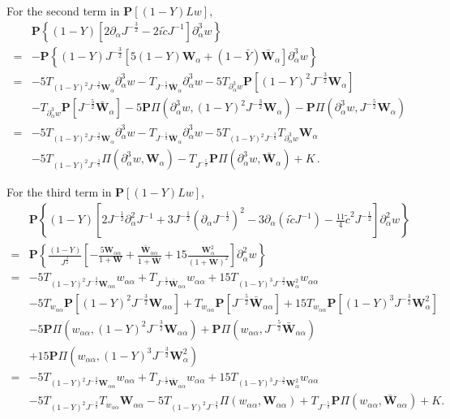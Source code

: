 \documentclass[10pt]{amsart}
\theoremstyle{remark}
\theoremstyle{definition}
\numberwithin{equation}{section}
\newcommand{\p}{\partial}
\newcommand{\al}{\alpha}
\newcommand{\f}{\frac}
\newcommand{\bw}{\mathbf{W}}
\newcommand{\nP}{{\mathbf P}}
\begin{document}
For the second term in $\nP[(1-Y)Lw]$, 
\begin{equation*}
\begin{split}
&\nP\left\{(1-Y)\left[2\p_{\al}J^{-\f32}-2i\tilde{c}J^{-1}\right]\p_{\al}^3w\right\}\\
=&-\nP\left\{(1-Y)J^{-\f32}\left[5(1-Y)\mathbf{W}_{\al}+(1-\bar{Y})\bar{\mathbf{W}}_{\al}\right]\p_{\al}^3w \right\}\\
=&-5T_{(1-Y)^2J^{-\f32}\mathbf{W}_{\al}}\p_{\al}^3w-T_{J^{-\f52}\bar{\bw}_{\al}}\p_{\al}^3w-5T_{\p_{\al}^3w}\nP\left[(1-Y)^2J^{-\f32}\mathbf{W}_{\al}\right] \\
&-T_{\p_{\al}^3w}\nP \left[J^{-\f52}\bar{\bw}_{\al} \right]-5\nP\Pi(\p^3_{\al}w,(1-Y)^2J^{-\f32}\mathbf{W}_{\al})
-\nP\Pi(\p^3_{\al}w,J^{-\f52}\mathbf{W}_{\al})\, \\
=&-5T_{(1-Y)^2J^{-\f32}\mathbf{W}_{\al}}\p_{\al}^3w-T_{J^{-\f52}\bar{\bw}_{\al}}\p_{\al}^3w-5T_{(1-Y)^2J^{-\f32}}T_{\p_{\al}^3w}\mathbf{W}_{\al} \\
&-5T_{(1-Y)^2J^{-\f32}}\Pi(\p^3_{\al}w,\mathbf{W}_{\al})
-T_{J^{-\f52}}\nP\Pi(\p^3_{\al}w,\bar{\bw}_{\al}) + K\, .
\end{split}
\end{equation*}

For the third term  in $\nP[(1-Y)Lw]$, 
\begin{equation*}
\begin{split}
&\nP\left \{(1-Y)\left[2J^{-\f12}\p^2_{\al}J^{-1}+3J^{-\f12}(\p_{\al}J^{-\f12})^2-3\p_{\al}(i\tilde{c}J^{-1})-\f{11}{4}\tilde{c}^2J^{-\f12}\right]\p_{\al}^2w \right\}\\
=&\nP \left\{\f{(1-Y)}{J^{\f32}}\left[-\f{5\mathbf{W}_{\al\al}}{1+\mathbf{W}}+\f{\bar{\mathbf{W}}_{\al\al}}{1+\bar{\mathbf{W}}}+15\f{\mathbf{W}^2_{\al}}{(1+\mathbf{W})^2}\right]\p_{\al}^2w\right\}\\
=&-5T_{(1-Y)^2J^{-\f32}\mathbf{W}_{\al\al}}w_{\al\al}+T_{J^{-\f52}\bar{\mathbf{W}}_{\al\al}}w_{\al\al}+15T_{(1-Y)^3J^{-\f32}\mathbf{W}^2_{\al}}w_{\al\al}\\
&-5T_{w_{\al\al}} \nP\left[(1-Y)^2J^{-\f32}\mathbf{W}_{\al\al}\right]+T_{w_{\al\al}}\nP \left[J^{-\f52}\bar{\mathbf{W}}_{\al\al}\right]+15T_{w_{\al\al}} \nP\left[(1-Y)^3J^{-\f32}\mathbf{W}^2_{\al}\right]\\
&-5\nP\Pi(w_{\al\al},(1-Y)^2J^{-\f32}\mathbf{W}_{\al\al})+\nP\Pi(w_{\al\al},J^{-\f52}\bar{\mathbf{W}}_{\al\al})\\
&+15\nP\Pi(w_{\al\al},(1-Y)^3J^{-\f32}\mathbf{W}^2_{\al})\, \\
=& -5T_{(1-Y)^2J^{-\f32}\mathbf{W}_{\al\al}}w_{\al\al}+T_{J^{-\f52}\bar{\mathbf{W}}_{\al\al}}w_{\al\al}+15T_{(1-Y)^3J^{-\f32}\mathbf{W}^2_{\al}}w_{\al\al}\\
&-5T_{(1-Y)^2J^{-\f32}}T_{w_{\al\al}} \mathbf{W}_{\al\al} -5T_{(1-Y)^2 J^{-\f32}}\Pi(w_{\al\al},\mathbf{W}_{\al\al})+T_{J^{-\f52}}\nP\Pi(w_{\al\al},\bar{\mathbf{W}}_{\al\al}) + K.
\end{split}
\end{equation*}
\end{document}
